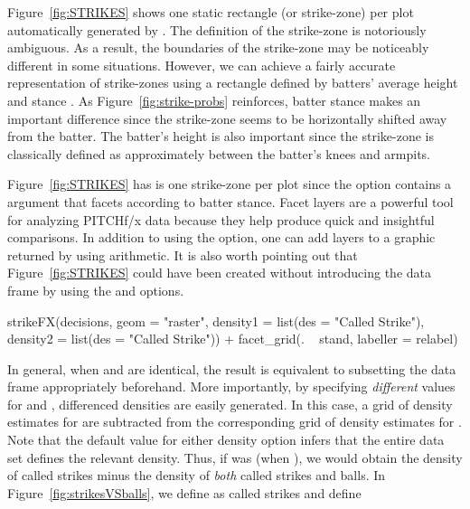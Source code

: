 \begin{article}
Figure~\ref{fig:STRIKES} shows one static rectangle (or strike-zone)
per plot automatically generated by . The definition
of the strike-zone is notoriously ambiguous. As a result, the boundaries
of the strike-zone may be noticeably different in some situations.
However, we can achieve a fairly accurate representation of strike-zones
using a rectangle defined by batters' average height and stance \citep{Strikezones}.
As Figure~\ref{fig:strike-probs} reinforces, batter stance makes
an important difference since the strike-zone seems to be horizontally
shifted away from the batter. The batter's height is also important
since the strike-zone is classically defined as approximately between
the batter's knees and armpits.

Figure~\ref{fig:STRIKES} has is one strike-zone per plot since the
 option contains a  argument that facets
according to batter stance. Facet layers are a powerful tool for analyzing
PITCHf/x data because they help produce quick and insightful comparisons.
In addition to using the  option, one can add layers
to a graphic returned by  using  arithmetic.
It is also worth pointing out that Figure~\ref{fig:STRIKES} could
have been created without introducing the  data frame
by using the  and  options. 
%
\begin{Schunk}
\begin{Sinput}
strikeFX(decisions, geom = "raster", density1 = list(des = "Called Strike"),          
  density2 = list(des = "Called Strike")) + facet_grid(. ~ stand, labeller = relabel)
\end{Sinput}
\end{Schunk}
%
In general, when  and  are identical,
the result is equivalent to subsetting the data frame appropriately
beforehand. More importantly, by specifying \emph{different} values
for  and , differenced densities are
easily generated. In this case, a grid of density estimates for 
are subtracted from the corresponding grid of density estimates for
. Note that the default  value for either
density option infers that the entire data set defines the relevant
density. Thus, if  was  (when ),
we would obtain the density of called strikes minus the density of
\emph{both} called strikes and balls. In Figure~\ref{fig:strikesVSballs},
we define  as called strikes and define 

\end{article}
